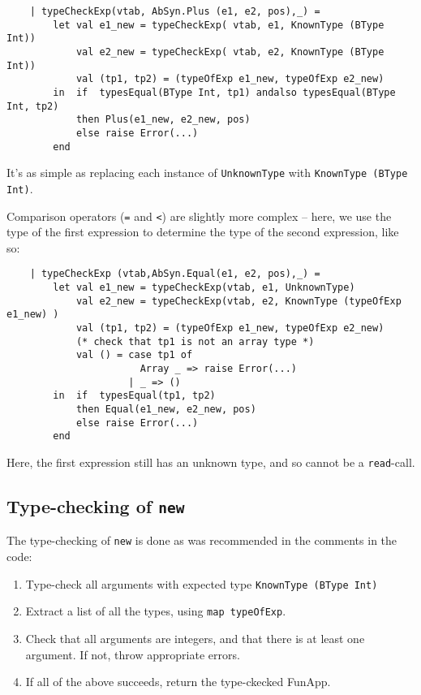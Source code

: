 \documentclass{article}
\begin{document}
\begin{lstlisting}
    | typeCheckExp(vtab, AbSyn.Plus (e1, e2, pos),_) =
        let val e1_new = typeCheckExp( vtab, e1, KnownType (BType Int))
            val e2_new = typeCheckExp( vtab, e2, KnownType (BType Int))
            val (tp1, tp2) = (typeOfExp e1_new, typeOfExp e2_new)
        in  if  typesEqual(BType Int, tp1) andalso typesEqual(BType Int, tp2)
            then Plus(e1_new, e2_new, pos)
            else raise Error(...)
        end
\end{lstlisting}

It's as simple as replacing each instance of \texttt{UnknownType} with \texttt{KnownType (BType Int)}.

Comparison operators (\texttt{=} and \texttt{<}) are slightly more complex -- here, we use the type of the first expression to determine the type of the second expression, like so:

\begin{lstlisting}
    | typeCheckExp (vtab,AbSyn.Equal(e1, e2, pos),_) =
        let val e1_new = typeCheckExp(vtab, e1, UnknownType)
            val e2_new = typeCheckExp(vtab, e2, KnownType (typeOfExp e1_new) )
            val (tp1, tp2) = (typeOfExp e1_new, typeOfExp e2_new)
            (* check that tp1 is not an array type *)
            val () = case tp1 of
                       Array _ => raise Error(...)
                     | _ => ()
        in  if  typesEqual(tp1, tp2)
            then Equal(e1_new, e2_new, pos)
            else raise Error(...)
        end
\end{lstlisting}

Here, the first expression still has an unknown type, and so cannot be a \texttt{read}-call.

\subsection{Type-checking of \texttt{new}}
The type-checking of \texttt{new} is done as was recommended in the comments in the code:

\begin{enumerate}
    \item Type-check all arguments with expected type \texttt{KnownType (BType Int)}
    \item Extract a list of all the types, using \texttt{map typeOfExp}.
    \item Check that all arguments are integers, and that there is at least one argument. If not, throw appropriate errors.
    \item If all of the above succeeds, return the type-ckecked FunApp.
\end{enumerate}
\end{document}
